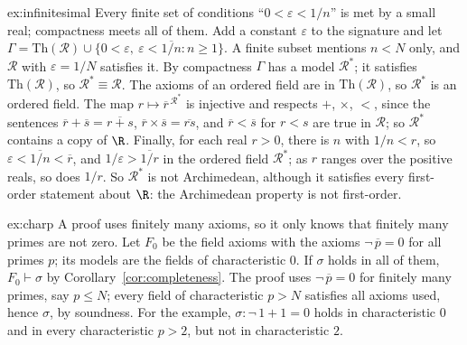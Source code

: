 \begin{solution}{ex:infinitesimal}
\idea Every finite set of conditions ``$0<\varepsilon<1/n$'' is met by a small real; compactness meets all of them.
\writeup Add a constant $\varepsilon$ to the signature and let $\Gamma=\mathrm{Th}(\mathcal R)\cup\{0<\varepsilon,\ \varepsilon<\overline{1/n}:n\ge1\}$. A finite subset mentions $n<N$ only, and $\mathcal R$ with $\varepsilon=1/N$ satisfies it. By compactness $\Gamma$ has a model $\mathcal R^*$; it satisfies $\mathrm{Th}(\mathcal R)$, so $\mathcal R^*\equiv\mathcal R$. The axioms of an ordered field are in $\mathrm{Th}(\mathcal R)$, so $\mathcal R^*$ is an ordered field. The map $r\mapsto\overline r^{\,\mathcal R^*}$ is injective and respects $+$, $\times$, $<$, since the sentences $\overline r+\overline s=\overline{r+s}$, $\overline r\times\overline s=\overline{rs}$, and $\overline r<\overline s$ for $r<s$ are true in $\mathcal R$; so $\mathcal R^*$ contains a copy of $\R$. Finally, for each real $r>0$, there is $n$ with $1/n<r$, so $\varepsilon<\overline{1/n}<\overline r$, and $1/\varepsilon>\overline{1/r}$ in the ordered field $\mathcal R^*$; as $r$ ranges over the positive reals, so does $1/r$. So $\mathcal R^*$ is not Archimedean, although it satisfies every first-order statement about $\R$: the Archimedean property is not first-order.
\end{solution}

\begin{solution}{ex:charp}
\idea A proof uses finitely many axioms, so it only knows that finitely many primes are not zero.
\writeup Let $F_0$ be the field axioms with the axioms $\neg\,\overline p=0$ for all primes $p$; its models are the fields of characteristic $0$. If $\sigma$ holds in all of them, $F_0\vdash\sigma$ by Corollary~\ref{cor:completeness}. The proof uses $\neg\,\overline p=0$ for finitely many primes, say $p\le N$; every field of characteristic $p>N$ satisfies all axioms used, hence $\sigma$, by soundness. For the example, $\sigma:\neg\,1+1=0$ holds in characteristic $0$ and in every characteristic $p>2$, but not in characteristic $2$.
\end{solution}


